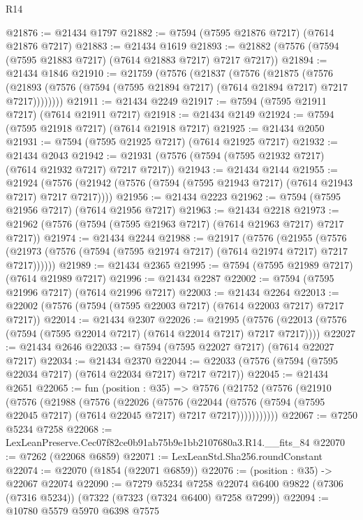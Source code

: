 \begin{lexlean}{R14}
\begin{coremodule}
@21876 := @21434 @1797
@21882 := @7594 (@7595 @21876 @7217) (@7614 @21876 @7217)
@21883 := @21434 @1619
@21893 := @21882 (@7576 (@7594 (@7595 @21883 @7217) (@7614 @21883 @7217) @7217 @7217))
@21894 := @21434 @1846
@21910 := @21759
    (@7576
      (@21837
        (@7576
          (@21875
            (@7576
              (@21893 (@7576 (@7594 (@7595 @21894 @7217) (@7614 @21894 @7217) @7217 @7217))))))))
@21911 := @21434 @2249
@21917 := @7594 (@7595 @21911 @7217) (@7614 @21911 @7217)
@21918 := @21434 @2149
@21924 := @7594 (@7595 @21918 @7217) (@7614 @21918 @7217)
@21925 := @21434 @2050
@21931 := @7594 (@7595 @21925 @7217) (@7614 @21925 @7217)
@21932 := @21434 @2043
@21942 := @21931 (@7576 (@7594 (@7595 @21932 @7217) (@7614 @21932 @7217) @7217 @7217))
@21943 := @21434 @2144
@21955 := @21924
    (@7576 (@21942 (@7576 (@7594 (@7595 @21943 @7217) (@7614 @21943 @7217) @7217 @7217))))
@21956 := @21434 @2223
@21962 := @7594 (@7595 @21956 @7217) (@7614 @21956 @7217)
@21963 := @21434 @2218
@21973 := @21962 (@7576 (@7594 (@7595 @21963 @7217) (@7614 @21963 @7217) @7217 @7217))
@21974 := @21434 @2244
@21988 := @21917
    (@7576
      (@21955
        (@7576 (@21973 (@7576 (@7594 (@7595 @21974 @7217) (@7614 @21974 @7217) @7217 @7217))))))
@21989 := @21434 @2365
@21995 := @7594 (@7595 @21989 @7217) (@7614 @21989 @7217)
@21996 := @21434 @2287
@22002 := @7594 (@7595 @21996 @7217) (@7614 @21996 @7217)
@22003 := @21434 @2264
@22013 := @22002 (@7576 (@7594 (@7595 @22003 @7217) (@7614 @22003 @7217) @7217 @7217))
@22014 := @21434 @2307
@22026 := @21995
    (@7576 (@22013 (@7576 (@7594 (@7595 @22014 @7217) (@7614 @22014 @7217) @7217 @7217))))
@22027 := @21434 @2646
@22033 := @7594 (@7595 @22027 @7217) (@7614 @22027 @7217)
@22034 := @21434 @2370
@22044 := @22033 (@7576 (@7594 (@7595 @22034 @7217) (@7614 @22034 @7217) @7217 @7217))
@22045 := @21434 @2651
@22065 := fun (position : @35) =>
  @7576
    (@21752
      (@7576
        (@21910
          (@7576
            (@21988
              (@7576
                (@22026
                  (@7576
                    (@22044
                      (@7576 (@7594 (@7595 @22045 @7217) (@7614 @22045 @7217) @7217 @7217)))))))))))
@22067 := @7250 @5234 @7258
@22068 := LexLeanPreserve.Cec07f82ce0b91ab75b9e1bb2107680a3.R14.__fits_84
@22070 := @7262 (@22068 @6859)
@22071 := LexLeanStd.Sha256.roundConstant
@22074 := @22070 (@1854 (@22071 @6859))
@22076 := (position : @35) -> @22067 @22074
@22090 := @7279
    @5234
    @7258
    @22074
    @6400
    @9822
    (@7306 (@7316 @5234))
    (@7322 (@7323 (@7324 @6400) @7258 @7299))
@22094 := @10780 @5579 @5970 @6398 @7575

\end{coremodule}
\end{lexlean}
